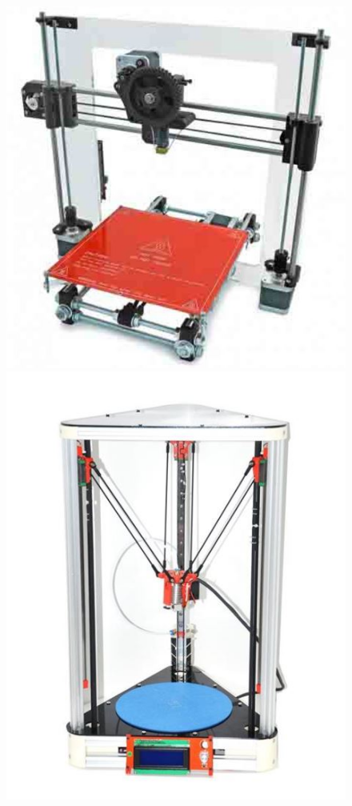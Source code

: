 \documentclass[a4paper, twoside, 11pt]{report}
\begin{document}
\begin{figure}[h]
  \centering
  \begin{minipage}[b]{0.3\textwidth}
    \includegraphics[width=\textwidth]{cartesianPrinter}
  \end{minipage}
  \hfill
  \begin{minipage}[b]{0.3\textwidth}
    \includegraphics[width=\textwidth]{deltaPrinter}

\end{minipage}
\end{figure}
\end{document}
